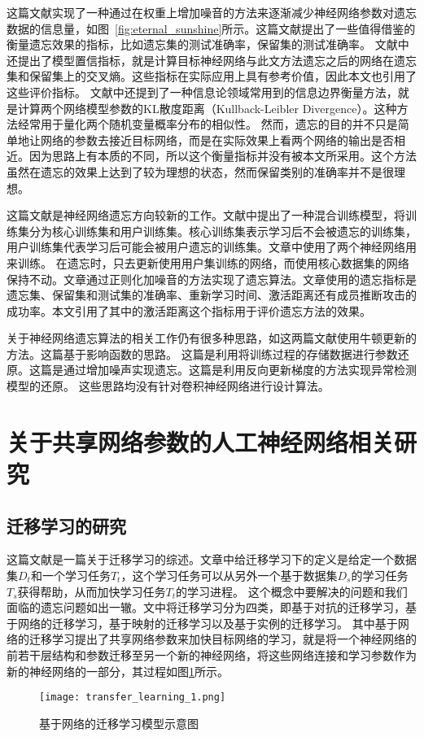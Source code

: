 这篇文献\cite{Golatkar_2020_CVPR}实现了一种通过在权重上增加噪音的方法来逐渐减少神经网络参数对遗忘数据的信息量，如图~\ref{fig:eternal_sunshine}所示。这篇文献提出了一些值得借鉴的衡量遗忘效果的指标，比如遗忘集的测试准确率，保留集的测试准确率。
文献中还提出了模型置信指标，就是计算目标神经网络与此文方法遗忘之后的网络在遗忘集和保留集上的交叉熵。这些指标在实际应用上具有参考价值，因此本文也引用了这些评价指标。
文献中还提到了一种信息论领域常用到的信息边界衡量方法，就是计算两个网络模型参数的KL散度距离（Kullback-Leibler Divergence）。这种方法经常用于量化两个随机变量概率分布的相似性。
然而，遗忘的目的并不只是简单地让网络的参数去接近目标网络，而是在实际效果上看两个网络的输出是否相近。因为思路上有本质的不同，所以这个衡量指标并没有被本文所采用。这个方法虽然在遗忘的效果上达到了较为理想的状态，然而保留类别的准确率并不是很理想。

这篇文献\cite{Golatkar_2021_CVPR}是神经网络遗忘方向较新的工作。文献中提出了一种混合训练模型，将训练集分为核心训练集和用户训练集。核心训练集表示学习后不会被遗忘的训练集，用户训练集代表学习后可能会被用户遗忘的训练集。文章中使用了两个神经网络用来训练。
在遗忘时，只去更新使用用户集训练的网络，而使用核心数据集的网络保持不动。文章通过正则化加噪音的方法实现了遗忘算法。文章使用的遗忘指标是遗忘集、保留集和测试集的准确率、重新学习时间、激活距离还有成员推断攻击的成功率。本文引用了其中的激活距离这个指标用于评价遗忘方法的效果。

关于神经网络遗忘算法的相关工作仍有很多种思路，如这两篇文献\cite{10.1007/978-3-030-58526-6_23,pmlr-v119-guo20c}使用牛顿更新的方法。这篇\cite{pmlr-v130-izzo21a}基于影响函数\cite{pmlr-v70-koh17a,cook_weisberg_1982}的思路。
这篇\cite{pmlr-v119-wu20b}是利用将训练过程的存储数据进行参数还原。这篇\cite{pmlr-v132-neel21a}是通过增加噪声实现遗忘。这篇\cite{10.1145/3319535.3363226}是利用反向更新梯度的方法实现异常检测模型的还原。
这些思路均没有针对卷积神经网络进行设计算法。


\section{关于共享网络参数的人工神经网络相关研究}

\subsection{迁移学习的研究}

这篇文献\cite{10.1007/978-3-030-01424-7_27}是一篇关于迁移学习的综述。文章中给迁移学习下的定义是给定一个数据集$D_t$和一个学习任务$T_t$，这个学习任务可以从另外一个基于数据集$D_s$的学习任务$T_s$获得帮助，从而加快学习任务$T_t$的学习进程。
这个概念中要解决的问题和我们面临的遗忘问题如出一辙。文中将迁移学习分为四类，即基于对抗的迁移学习，基于网络的迁移学习，基于映射的迁移学习以及基于实例的迁移学习。
其中基于网络的迁移学习提出了共享网络参数来加快目标网络的学习，就是将一个神经网络的前若干层结构和参数迁移至另一个新的神经网络，将这些网络连接和学习参数作为新的神经网络的一部分，其过程如图\ref{fig:transfer_learning_1}所示。
\begin{figure}
    \centering
    \texttt{[image: transfer\_learning\_1.png]}
    \caption{基于网络的迁移学习模型示意图\cite{10.1007/978-3-030-01424-7_27}}
    \label{fig:transfer_learning_1}
\end{figure}

